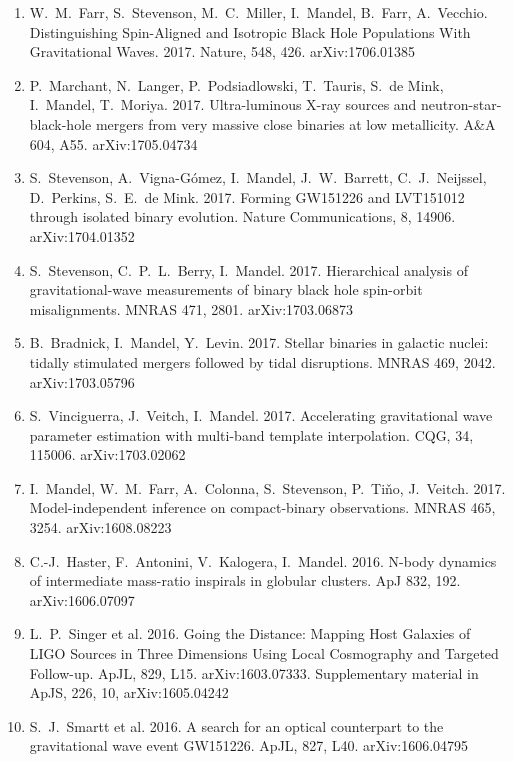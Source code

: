 \documentclass[margin,line]{res}
\begin{document}
\begin{resume}
\begin{enumerate}
\item W.~M.~Farr, S.~Stevenson, M.~C.~Miller, I.~Mandel, B.~Farr, A.~Vecchio.  Distinguishing Spin-Aligned and Isotropic Black Hole Populations With Gravitational Waves. 2017. Nature, 548, 426. arXiv:1706.01385

\item P.~Marchant, N.~Langer, P.~Podsiadlowski, T.~Tauris, S.~de Mink, I.~Mandel, T.~Moriya.  2017.  Ultra-luminous X-ray sources and neutron-star-black-hole mergers from very massive close binaries at low metallicity.  A\&A 604, A55.  arXiv:1705.04734

\item S.~Stevenson, A.~Vigna-G\'omez, I.~Mandel, J.~W.~Barrett, C.~J.~Neijssel, D.~Perkins, S.~E.~de Mink.  2017.  Forming GW151226 and LVT151012 through isolated binary evolution.  Nature Communications, 8,  14906.  arXiv:1704.01352

\item S.~Stevenson, C.~P.~L.~Berry, I.~Mandel.  2017.  Hierarchical analysis of gravitational-wave measurements of binary black hole spin-orbit misalignments.  MNRAS 471, 2801. arXiv:1703.06873

\item B.~Bradnick, I.~Mandel, Y.~Levin. 2017.  Stellar binaries in galactic nuclei: tidally stimulated mergers followed by tidal disruptions.  MNRAS 469, 2042.  arXiv:1703.05796

\item S.~Vinciguerra, J.~Veitch, I.~Mandel.  2017.  Accelerating gravitational wave parameter estimation with multi-band template interpolation.  CQG, 34, 115006.  arXiv:1703.02062

\item I.~Mandel, W.~M.~Farr, A.~Colonna, S.~Stevenson, P.~Ti\v{n}o, J.~Veitch.  2017.  Model-independent inference on compact-binary observations.  MNRAS 465, 3254.  arXiv:1608.08223

\item C.-J.~Haster, F.~Antonini, V.~Kalogera, I.~Mandel. 2016. N-body dynamics of intermediate mass-ratio inspirals in globular clusters. ApJ 832, 192.  arXiv:1606.07097

\item L.~P.~Singer et al. 2016.  Going the Distance: Mapping Host Galaxies of LIGO Sources in Three Dimensions Using Local Cosmography and Targeted Follow-up.  ApJL, 829, L15. arXiv:1603.07333.   Supplementary material in ApJS, 226, 10, arXiv:1605.04242

\item S.~J.~Smartt et al.  2016.  A search for an optical counterpart to the gravitational wave event GW151226.  ApJL, 827, L40. arXiv:1606.04795


\end{enumerate}
\end{resume}
\end{document}
